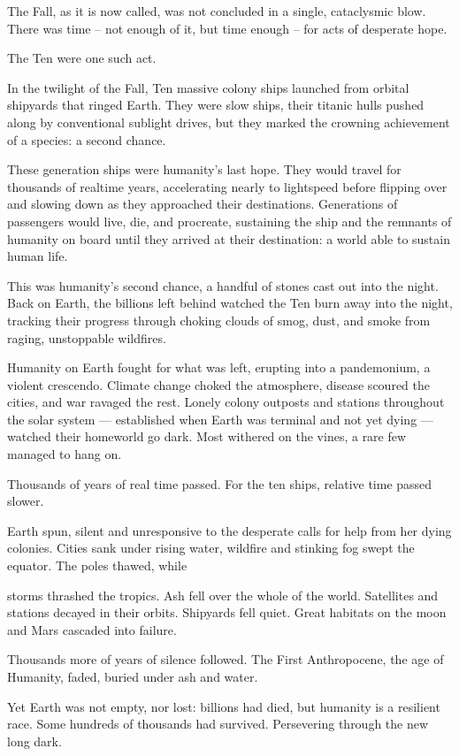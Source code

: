 The Fall, as it is now called, was not concluded in a single, cataclysmic blow. There was time --
not enough of it, but time enough -- for acts of desperate hope.


The Ten were one such act.


In the twilight of the Fall, Ten massive colony ships launched from orbital shipyards that ringed
Earth. They were slow ships, their titanic hulls pushed along by conventional sublight drives, but
they marked the crowning achievement of a species: a second chance.


These generation ships were humanity’s last hope. They would travel for thousands of realtime
years, accelerating nearly to lightspeed before flipping over and slowing down as they
approached their destinations. Generations of passengers would live, die, and procreate,
sustaining the ship and the remnants of humanity on board until they arrived at their destination:
a world able to sustain human life.


This was humanity’s second chance, a handful of stones cast out into the night. Back on Earth,
the billions left behind watched the Ten burn away into the night, tracking their progress through
choking clouds of smog, dust, and smoke from raging, unstoppable wildfires.


Humanity on Earth fought for what was left, erupting into a pandemonium, a violent crescendo.
Climate change choked the atmosphere, disease scoured the cities, and war ravaged the rest.
Lonely colony outposts and stations throughout the solar system — established when Earth was
terminal and not yet dying — watched their homeworld go dark. Most withered on the vines, a
rare few managed to hang on.


Thousands of years of real time passed. For the ten ships, relative time passed slower.


Earth spun, silent and unresponsive to the desperate calls for help from her dying colonies. Cities
sank under rising water, wildfire and stinking fog swept the equator. The poles thawed, while




storms thrashed the tropics. Ash fell over the whole of the world. Satellites and stations decayed
in their orbits. Shipyards fell quiet. Great habitats on the moon and Mars cascaded into failure.


Thousands more of years of silence followed. The First Anthropocene, the age of Humanity,
faded, buried under ash and water.


Yet Earth was not empty, nor lost: billions had died, but humanity is a resilient race. Some
hundreds of thousands had survived. Persevering through the new long dark.


